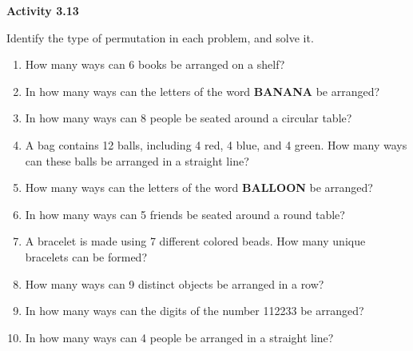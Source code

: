 \vspace{0.3ex}
\noindent\textbf{Activity 3.13}

\vspace{0.2ex}

Identify the type of permutation in each problem, and solve it.

\begin{enumerate}[label=\color{blue}\arabic*.]
    \item How many ways can 6 books be arranged on a shelf?
    \item In how many ways can the letters of the word \textbf{BANANA} be arranged?
    \item In how many ways can 8 people be seated around a circular table?
    \item A bag contains 12 balls, including 4 red, 4 blue, and 4 green. How many ways can these balls be arranged in a straight line?
    \item How many ways can the letters of the word \textbf{BALLOON} be arranged?
    \item In how many ways can 5 friends be seated around a round table?
    \item A bracelet is made using 7 different colored beads. How many unique bracelets can be formed?
    \item How many ways can 9 distinct objects be arranged in a row?
    \item In how many ways can the digits of the number 112233 be arranged?
    \item In how many ways can 4 people be arranged in a straight line?
\end{enumerate}
